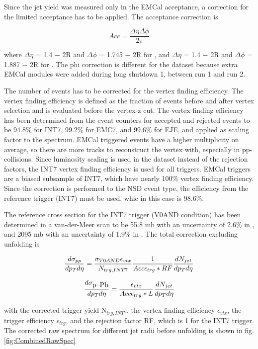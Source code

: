 Since the jet yield was measured only in the EMCal acceptance, a correction for the limited acceptance has to be applied. The acceptance correction is

\begin{equation}
    Acc = \frac{\Delta\eta \Delta\phi}{2\pi}
\end{equation}

where $\Delta\eta$ = 1.4 − 2R and $\Delta\phi$ = 1.745 − 2R for \pp, and $\Delta\eta$ = 1.4 − 2R and $\Delta\phi$ = 1.887 − 2R for \pPb. The phi correction is different for the \pPb dataset because extra EMCal modules were added during long shutdown 1, between run 1 and run 2.

The number of events has to be corrected for the vertex finding efficiency. The vertex finding efficiency is defined as the fraction of events before and after vertex selection and is evaluated before the vertex-z cut. The vertex finding efficiency has been determined from the event counters for accepted and rejected events to be 94.8$\%$ for INT7, 99.2$\%$ for EMC7, and 99.6$\%$ for EJE, and applied as scaling factor to the spectrum. EMCal triggered events have a higher multiplicity on average, so there are more tracks to reconstruct the vertex with, especially in pp-collisions. Since luminosity scaling is used in the \pPb dataset instead of the rejection factors, the INT7 vertex finding efficiency is used for all triggers. EMCal triggers are a biased subsample of INT7, which have nearly 100\% vertex finding efficiency. Since the correction is performed to the NSD event type, the efficiency from the reference trigger (INT7) must be used, whic in this case is 98.6\%.

The reference cross section for the INT7 trigger (V0AND condition) has been determined in a van-der-Meer scan to be 55.8 mb with an uncertainty of 2.6$\%$ in \pp, and 2095 mb with an uncertainty of 1.9$\%$ in \pPb. The total correction excluding unfolding is

\begin{equation}
   \frac{d\sigma_{pp}}{dp_T d\eta} = \frac{\sigma_{V0AND}\epsilon_{vtx}}{N_{trg,INT7}} \frac{1}{Acc\epsilon_{trg}*RF} \frac{dN_{jet}}{dp_T d\eta}
\end{equation}

\begin{equation}
   \frac{d\sigma_{{\mbox{p--Pb}}}}{dp_T d\eta} = \frac{\epsilon_{vtx}}{Acc\epsilon_{trg}*L} \frac{dN_{jet}}{dp_T d\eta}
\end{equation}

with the corrected trigger yield N$_{trg,INT7}$, the vertex finding efficiency $\epsilon_{vtx}$, the trigger efficiency $\epsilon_{trg}$, and the rejection factor RF, which is 1 for the INT7 trigger. The corrected raw spectrum for different jet radii before unfolding is shown in fig. \ref{fig:CombinedRawSpec}

